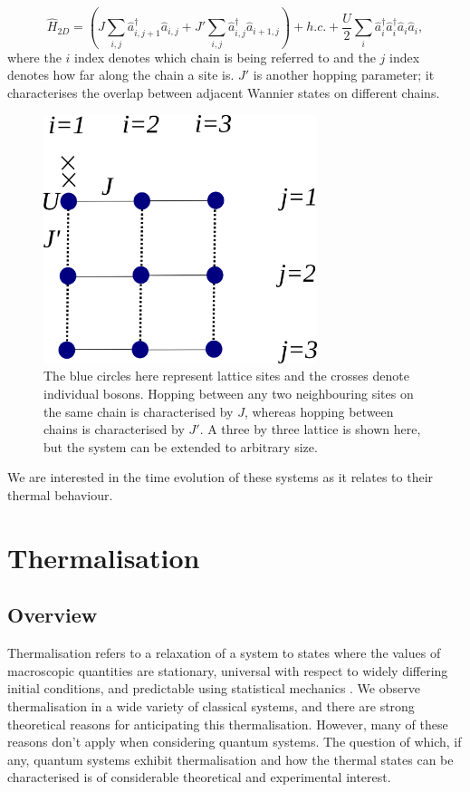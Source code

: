 \documentclass[a4paper,10pt]{article}
\begin{document}
\begin{equation}
\hat{H}_{2D}=(J\sum_{i,j}\hat{a}^\dagger_{i,j+1}\hat{a}_{i,j} + J'\sum_{i,j}\hat{a}^\dagger_{i,j}\hat{a}_{i+1,j})+h.c. +\frac{U}{2}\sum_{i}\hat{a}^\dagger_{i}\hat{a}^\dagger_{i}\hat{a}_{i}\hat{a}_{i},
\end{equation}
where the $i$ index denotes which chain is being referred to and the $j$ index denotes how far along the chain a site is. $J'$ is another hopping parameter; it characterises the 
overlap between adjacent Wannier states on different chains.
\begin{figure}[H]
 \begin{center}
   \includegraphics[width=8cm]{lattice_pic}
 \end{center}
 \caption{The blue circles here represent lattice sites and the crosses denote individual bosons. Hopping between any two neighbouring sites on the same chain is characterised by $J$, whereas hopping 
 between chains is characterised by $J'$. A three by three lattice is shown here, but the system can be extended to arbitrary size.}
 \end{figure}

 
We are interested in the time evolution of these systems as it relates to their thermal behaviour.

\newpage
\section{Thermalisation}
 \subsection{Overview}
 
Thermalisation refers to a relaxation of a system to states where the values of macroscopic quantities are stationary, universal with respect to 
widely differing initial conditions, and predictable using statistical mechanics \cite{Rigol2008}. We observe thermalisation in a wide variety of classical systems, and there 
are strong theoretical reasons for anticipating this thermalisation. However, many of these reasons don't apply when considering quantum systems. The question of 
which, if any, quantum systems exhibit thermalisation and how the thermal states can be characterised is of considerable theoretical and experimental interest. 
\end{document}
